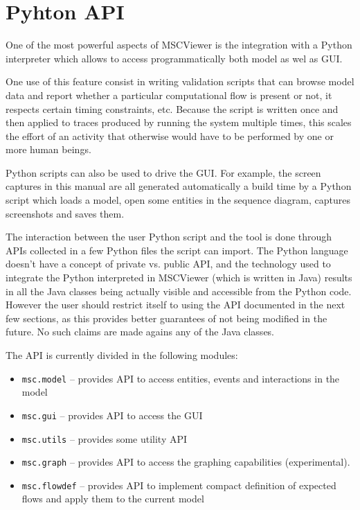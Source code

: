 \documentclass[11pt, twoside, titlepage]{book}
\newcommand{\prog}{MSCViewer}
\begin{document}
\chapter{Pyhton API}
One of the most powerful aspects of \prog{} is the integration with a Python interpreter
which allows to access programmatically both model as wel as GUI.

One use of this feature
consist in writing validation scripts that can browse model data and report whether a 
particular computational flow is present or not, it respects certain timing constraints, etc. 
Because the script is written once and then applied to traces produced by running the 
system multiple times, this scales the effort of an activity that otherwise would have to be
performed by one or more human beings. 

Python scripts can also be used to drive the GUI. For example, the screen captures in this 
manual are all generated automatically a build time by a Python script which loads a model,
open some entities in the sequence diagram, captures screenshots and saves them.

The interaction between the user Python script and the tool is done through APIs 
collected in a few Python files the script can import. The Python language doesn't 
have a concept of private vs. public API, and the technology used to integrate the 
Python interpreted in \prog{} (which is written in Java) results in all the Java 
classes being actually visible and accessible from the Python code. However the 
user should restrict itself to using the API documented in the next few sections,
as this provides better guarantees of not being modified in the future. No such 
claims are made agains any of the Java classes. 

The API is currently divided in the following modules:
\begin{itemize}
\item \texttt{msc.model} -- provides API to access entities, events and interactions in the model
\item \texttt{msc.gui} -- provides API to access the GUI 
\item \texttt{msc.utils} -- provides some utility API 
\item \texttt{msc.graph} -- provides API to access the graphing capabilities (experimental). 
\item \texttt{msc.flowdef} -- provides API to implement compact definition of expected flows and apply them
                              to the current model
\end{itemize}                              
\end{document}
